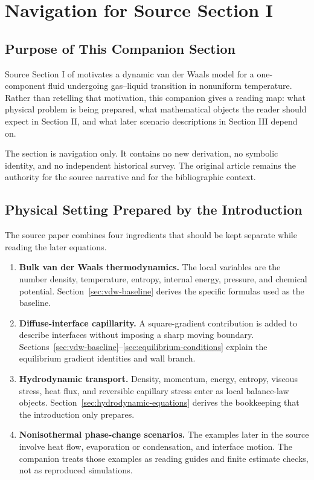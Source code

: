 \section{Navigation for Source Section I}
\label{sec:introduction-navigation}


\subsection{Purpose of This Companion Section}

Source Section I of \OnukiPRE{} motivates a dynamic van der Waals model for a
one-component fluid undergoing gas--liquid transition in nonuniform temperature.
Rather than retelling that motivation, this companion gives a reading map:
what physical problem is being prepared, what mathematical objects the reader
should expect in Section II, and what later scenario descriptions in Section III
depend on.

The section is navigation only.  It contains no new derivation, no symbolic
identity, and no independent historical survey.  The original article remains
the authority for the source narrative and for the bibliographic context.

\subsection{Physical Setting Prepared by the Introduction}

The source paper combines four ingredients that should be kept separate while
reading the later equations.

\begin{enumerate}[label=\arabic*.]
\item \textbf{Bulk van der Waals thermodynamics.}  The local variables are the
  number density, temperature, entropy, internal energy, pressure, and chemical
  potential.  Section~\ref{sec:vdw-baseline} derives the specific formulas used
  as the baseline.
\item \textbf{Diffuse-interface capillarity.}  A square-gradient contribution is
  added to describe interfaces without imposing a sharp moving boundary.
  Sections~\ref{sec:vdw-baseline}--\ref{sec:equilibrium-conditions} explain the
  equilibrium gradient identities and wall branch.
\item \textbf{Hydrodynamic transport.}  Density, momentum, energy, entropy,
  viscous stress, heat flux, and reversible capillary stress enter as local
  balance-law objects.  Section~\ref{sec:hydrodynamic-equations} derives the
  bookkeeping that the introduction only prepares.
\item \textbf{Nonisothermal phase-change scenarios.}  The examples later in the
  source involve heat flow, evaporation or condensation, and interface motion.
  The companion treats those examples as reading guides and finite estimate
  checks, not as reproduced simulations.
\end{enumerate}

